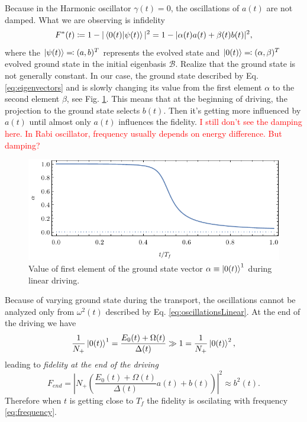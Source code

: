 Because in the Harmonic oscillator $\gamma(t)=0$, the oscillations of $a(t)$ are not damped. What we are observing is infidelity 
$$F^*(t)\coloneqq 1- |\braket{0(t)|\psi(t)}|^2 = 1-|\alpha(t)a(t)+\beta(t)b(t)|^2, $$
where the $\ket{\psi(t)}\eqqcolon(a,b)^T$ represents the evolved state and $\ket{0(t)}\eqqcolon(\alpha,\beta)^T$ evolved ground state in the initial eigenbasis $\mathcal{B}$. Realize that the ground state is not generally constant. In our case, the ground state described by Eq. \ref{eq:eigenvectors} and is slowly changing its value from the first element $\alpha$ to the second element $\beta$, see Fig. \ref{fig:zeroState}. This means that at the beginning of driving, the projection to the ground state selects $b(t)$. Then it's getting more influenced by $a(t)$ until almost only $a(t)$ influences the fidelity. \textcolor{red}{I still don't see the damping here. In Rabi oscillator,  frequency usually depends on energy difference. But damping?}
\begin{figure}[H]
    \centering
    \includegraphics[scale=1.2]{../img/zeroState.pdf}
    \caption{Value of first element of the ground state vector $\alpha\equiv \ket{0(t)}^1$ during linear driving.}
    \label{fig:zeroState}
\end{figure}

Because of varying ground state during the transport, the oscillations cannot be analyzed only from $\omega^2(t)$ described by Eq. \ref{eq:oscillationsLinear}. At the end of the driving we have 
\begin{equation}
   \frac{1}{N_+} \ket{0(t)}^1=\frac{E_0(t)+\Omega(t)}{\Delta(t)}\gg 1 =\frac{1}{N_+} \ket{0(t)}^2,
\end{equation}
leading to \emph{fidelity at the end of the driving}
\begin{equation}
    F_{end}= \left|N_+ \left(
        \frac{E_0(t)+\Omega(t)}{\Delta(t)} a(t)+b(t)
        \right)\right|^2 \approx b^2(t).
\end{equation}
Therefore when $t$ is getting close to $T_f$ the fidelity is oscilating with frequency \ref{eq:frequency}.




